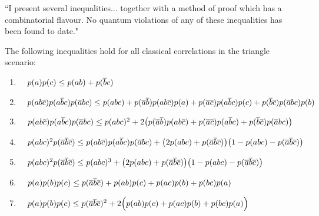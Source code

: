 ``I present several inequalities... together with a method of proof which has a combinatorial flavour. No quantum violations of any of these inequalities has been found to date."
%
\begin{theorem}
The following inequalities hold for all classical correlations in the triangle scenario:
\begin{enumerate}
\item
\(\quad
p(a) p(c)  \leq  p(a b) + p(\nb c)
\)
\item
\(\quad
p(a b\nc) p(a \nb c) p(\na b c) \leq p(a b c) + p(\na \nb) p(a b \nc) p(a) + p(\na\nc) p(a\nb c) p(c)  + p(\nb \nc) p(\na b c) p(b)
\)
\item 
\(\quad
p(a b\nc) p(a \nb c) p(\na b c) \leq p(a b c)^2 + 2\parens*{p(\na \nb) p(a b \nc) + p(\na\nc) p(a\nb c)  + p(\nb \nc) p(\na b c)}
\)
\item
\(\quad
p(a b c)^2 p(\na\nb\nc)  \leq  p(a b \nc) p(a \nb c) p(\na b c) + \parens*{2 p(a b c) + p(\na\nb\nc)} \parens*{1 - p(a b c) - p(\na\nb\nc)}
\)
\item
\(\quad
p(a b c)^2 p(\na\nb\nc)  \leq  p(a b c)^3 + \parens*{2 p(a b c) + p(\na\nb\nc)} \parens*{1 - p(a b c) - p(\na\nb\nc)}
\)
\item
\(\quad
p(a) p(b) p(c) \leq  p(\na\nb\nc) + p(a b) p(c) + p(a c) p(b) + p(b c) p(a)
\)
\item
\(\quad
p(a) p(b) p(c) \leq  p(\na\nb\nc)^2 +2\parens[\Big]{ p(a b) p(c) + p(a c) p(b) + p(b c) p(a) }
\)
\end{enumerate}
\end{theorem}

